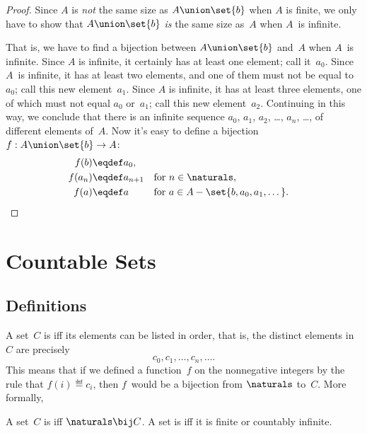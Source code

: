 \begin{proof}
Since $A$ is \emph{not} the same size as $A \union \set{b}$ when $A$
is finite, we only have to show that $A \union \set{b}$ \emph{is} the
same size as~$A$ when $A$~is infinite.

That is, we have to find a bijection between $A \union \set{b}$
and~$A$ when $A$~is infinite.  Since $A$ is infinite, it certainly has
at least one element; call it~$a_0$.  Since $A$~is infinite, it has at
least two elements, and one of them must not be equal to~$a_0$; call
this new element~$a_1$.  Since $A$ is infinite, it has at least three
elements, one of which must not equal $a_0$ or~$a_1$; call this new
element~$a_2$.  Continuing in this way, we conclude that there is an
infinite sequence $a_0$, $a_1$, $a_2$, \dots, $a_n$, \dots, of
different elements of~$A$.  Now it's easy to define a bijection $f: A
\union \set{b} \to A$:
\begin{align*}
    f(b)    &\eqdef a_0, \\
    f(a_n)  &\eqdef a_{n + 1}   && \text{for $n \in \naturals$}, \\
    f(a)    &\eqdef a           && \text{for $a \in A - \set{b, a_0,
        a_1, \dots}$}. \qedhere
\end{align*}
\end{proof}

\section{Countable Sets}\label{sec:countable}

\subsection{Definitions}

A set~$C$ is  iff its elements can be listed in order,
that is, the distinct elements in~$C$ are precisely
\begin{equation*}
    c_0, c_1, \dots, c_n, \dots.
\end{equation*}
This means that if we defined a function~$f$ on the nonnegative
integers by the rule that $f(i) \eqdef c_i$, then $f$~would be a
bijection from $\naturals$ to~$C$.  More formally,

\begin{definition}\label{def:countable}
A set~$C$ is  iff $\naturals \bij C$.  A set
is  iff it is finite or countably infinite.
\end{definition}

